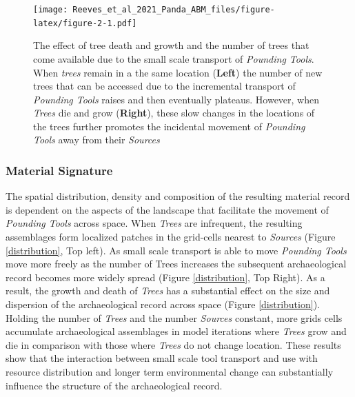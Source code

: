 \documentclass[9pt,twocolumn,twoside,]{pnas-new}
\begin{document}
\begin{figure}
\centering
\texttt{[image: Reeves\_et\_al\_2021\_Panda\_ABM\_files/figure-latex/figure-2-1.pdf]}
\caption{The effect of tree death and growth and the number of trees
that come available due to the small scale transport of \emph{Pounding
Tools}. When \emph{trees} remain in a the same location (\textbf{Left})
the number of new trees that can be accessed due to the incremental
transport of \emph{Pounding Tools} raises and then eventually plateaus.
However, when \emph{Trees} die and grow (\textbf{Right}), these slow
changes in the locations of the trees further promotes the incidental
movement of \emph{Pounding Tools} away from their \emph{Sources}
\label{tree_death}}
\end{figure}

\hypertarget{material-signature}{%
\subsubsection{Material Signature}\label{material-signature}}

The spatial distribution, density and composition of the resulting
material record is dependent on the aspects of the landscape that
facilitate the movement of \emph{Pounding Tools} across space. When
\emph{Trees} are infrequent, the resulting assemblages form localized
patches in the grid-cells nearest to \emph{Sources} (Figure
\ref{distribution}, Top left). As small scale transport is able to move
\emph{Pounding Tools} move more freely as the number of Trees increases
the subsequent archaeological record becomes more widely spread (Figure
\ref{distribution}, Top Right). As a result, the growth and death of
\emph{Trees} has a substantial effect on the size and dispersion of the
archaeological record across space (Figure \ref{distribution}). Holding
the number of \emph{Trees} and the number \emph{Sources} constant, more
grids cells accumulate archaeological assemblages in model iterations
where \emph{Trees} grow and die in comparison with those where
\emph{Trees} do not change location. These results show that the
interaction between small scale tool transport and use with resource
distribution and longer term environmental change can substantially
influence the structure of the archaeological record.
\end{document}

